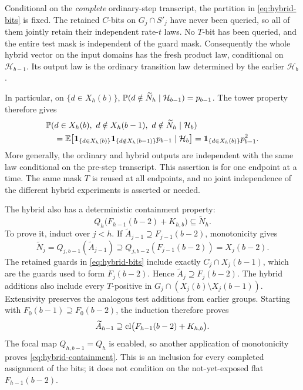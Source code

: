 Conditional on the \emph{complete} ordinary-step transcript, the
partition in \eqref{eq:hybrid-bits} is fixed. The retained $C$-bits on
$G_j\cap S'_j$ have never been queried, so all of them jointly retain
their independent rate-$t$ laws. No $T$-bit has been queried, and the
entire test mask is independent of the guard mask. Consequently the
whole hybrid vector on the input domains has the fresh product law,
conditional on $\mathcal H_{b-1}$. Its output law is the ordinary
transition law determined by the earlier $\mathcal H_b$.

In particular, on $\{d\in X_h(b)\}$,
$\mathbb P(d\notin\widetilde N_h\mid\mathcal H_{b-1})=p_{b-1}$.
The tower property therefore gives
\begin{align}
 &\mathbb P(d\in X_h(b),\ d\notin X_h(b-1),\ d\notin\widetilde N_h
                         \mid\mathcal H_b)\notag\\
 &\quad=\mathbb E\bigl[\mathbf 1_{\{d\in X_h(b)\}}\mathbf 1_{\{d\notin X_h(b-1)\}}
                         p_{b-1}\mid\mathcal H_b\bigr]
      =\mathbf 1_{\{d\in X_h(b)\}}p_{b-1}^{2}.
 \label{eq:double-exit}
\end{align}
More generally, the ordinary and hybrid outputs are independent with the
same law conditional on the pre-step transcript. This assertion is for
one endpoint at a time. The same mask $T$ is reused at all endpoints,
and no joint independence of the different hybrid experiments is
asserted or needed.

The hybrid also has a deterministic containment property:
\begin{equation}\label{eq:hybrid-containment}
 Q_h\bigl(F_{h-1}(b-2)+K_{h,b}\bigr)\subseteq\widetilde N_h.
\end{equation}
To prove it, induct over $j<h$. If
$\widetilde A_{j-1}\supseteq F_{j-1}(b-2)$, monotonicity gives
\[
 \widetilde N_j
 =Q_{j,b-1}(\widetilde A_{j-1})
 \supseteq Q_{j,b-2}(F_{j-1}(b-2))=X_j(b-2).
\]
The retained guards in \eqref{eq:hybrid-bits} include exactly
$C_j\cap X_j(b-1)$, which are the guards used to form $F_j(b-2)$.
Hence $\widetilde A_j\supseteq F_j(b-2)$. The hybrid additions also
include every $T$-positive in
$G_j\cap(X_j(b)\setminus X_j(b-1))$. Extensivity
preserves the analogous test additions from earlier groups. Starting
with $F_0(b-1)\supseteq F_0(b-2)$, the induction therefore proves
\[
 \widetilde A_{h-1}
 \supseteq\operatorname{cl}\bigl(F_{h-1}(b-2)+K_{h,b}\bigr).
\]
The focal map $Q_{h,b-1}=Q_h$ is enabled, so another application of
monotonicity proves \eqref{eq:hybrid-containment}. This is an inclusion
for every completed assignment of the bits; it does not condition on
the not-yet-exposed flat $F_{h-1}(b-2)$.

